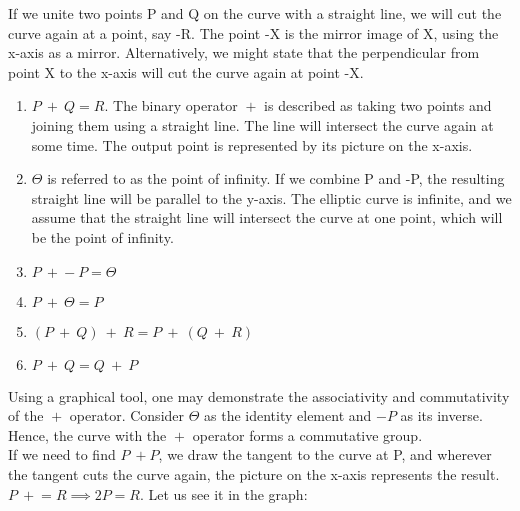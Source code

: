 \documentclass[11pt]{article}
\begin{document}
If we unite two points P and Q on the curve with a straight line, we will cut the curve again at a point, say -R. The point -X is the mirror image of X, using the x-axis as a mirror. Alternatively, we might state that the perpendicular from point X to the x-axis will cut the curve again at point -X.
\begin{enumerate}
    \item $P \  \boxed{+}  \ Q = R$. The binary operator $\boxed{+}$ is described as taking two points and joining them using a straight line. The line will intersect the curve again at some time. The output point is represented by its picture on the x-axis.
    \item $\Theta$ is referred to as the point of infinity. If we combine P and -P, the resulting straight line will be parallel to the y-axis. The elliptic curve is infinite, and we assume that the straight line will intersect the curve at one point, which will be the point of infinity.
    \item $P \ \boxed{+} -P = \Theta$
    \item ${P \ \boxed{+} \ \Theta = P}$
    \item $(P \ \boxed{+} \ Q) \ \boxed{+} \ R = P \ \boxed{+} \ (Q \ \boxed{+} \ R)$
    \item $P \ \boxed{+} \ Q = Q \ \boxed{+} \ P$
    
\end{enumerate}
Using a graphical tool, one may demonstrate the associativity and commutativity of the $\boxed{+}$ operator. Consider $\Theta$ as the identity element and $-P$ as its inverse. Hence, the curve with the $\boxed{+}$ operator forms a commutative group.\\
\newline
If we need to find $P \ \boxed{+} P$, we draw the tangent to the curve at P, and wherever the tangent cuts the curve again, the picture on the x-axis represents the result. $P \ \boxed{+} = R \implies 2P = R$. Let us see it in the graph:
\end{document}
